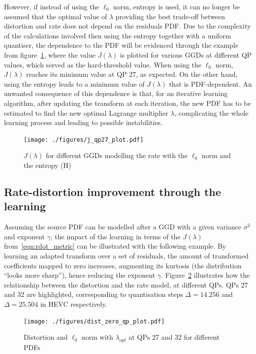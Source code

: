 \documentclass[11pt,a4paper,openright,twoside]{book}
\numberwithin{equation}{section} %
\numberwithin{figure}{section} %
\numberwithin{table}{section} %
\begin{document}
However, if instead of using the $\ell_0$ norm, entropy is used, it can
no longer be assumed that the optimal value of $\lambda$ providing the
best trade-off between distortion and rate does not depend on the
residuals \ac{PDF}.
Due to the complexity of the calculations involved then using the
entropy together with a uniform quantiser, the dependence to the
\ac{PDF} will be evidenced through the example from
figure~\ref{fig:j_lambda_qp}, where the value $J(\lambda)$ is plotted
for various \acp{GGD} at different \ac{QP} values, which served as the
hard-threshold value.
When using the $\ell_0$ norm, $J(\lambda)$ reaches its minimum value at
QP 27, as expected.
On the other hand, using the entropy leads to a minimum value of
$J(\lambda)$ that is \ac{PDF}-dependent.
An unwanted consequence of this dependence is that, for an iterative
learning algorithm, after updating the transform at each iteration, the
new \ac{PDF} has to be estimated to find the new optimal Lagrange
multiplier $\lambda$, complicating the whole learning process and
leading to possible instabilities.
\begin{figure}[tp]
	\centering
	\texttt{[image: ./figures/j\_qp27\_plot.pdf]}
	\caption{$J(\lambda)$ for different \acp{GGD} modelling the rate with
	the $\ell_0$ norm and the entropy (H)}
	\label{fig:j_lambda_qp}
\end{figure}

\subsection{Rate-distortion improvement through the learning}
\label{sub:rate_distortion_improvement_through_the_learning}

Assuming the source \ac{PDF} can be modelled after a \ac{GGD} with a
given variance $\sigma^2$ and exponent $\gamma$, the impact of the
learning in terms of the $J(\lambda)$ from~\eqref{eqn:rdot_metric} can
be illustrated with the following example.
By learning an adapted transform over a set of residuals, the amount of
transformed coefficients mapped to zero increases, augmenting its
kurtosis (the distribution ``looks more sharp''), hence reducing the
exponent $\gamma$.
Figure~\ref{fig:lambda_zero_norm_dist} illustrates how the relationship
between the distortion and the rate model, at different \acp{QP}.
\acp{QP} 27 and 32 are highlighted, corresponding to quantisation steps
$\Delta = 14.256$ and $\Delta = 25.504$ in \ac{HEVC} respectively.

\begin{figure}[tp]
	\centering
	\texttt{[image: ./figures/dist\_zero\_qp\_plot.pdf]}
	\caption{Distortion and $\ell_0$ norm with $\lambda_{opt}$ at
	\acsp{QP} 27 and 32 for different \acsp{PDF}}
	\label{fig:lambda_zero_norm_dist}
\end{figure}
\end{document}
